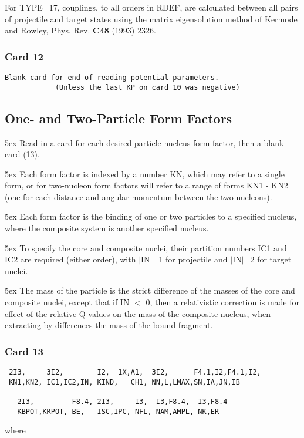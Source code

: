 \documentclass[11pt]{article}
\begin{document}
For TYPE=17, couplings, to all orders in RDEF, are calculated between all
pairs of projectile and target states using the matrix eigensolution
method of Kermode and Rowley, Phys. Rev. {\bf C48} (1993) 2326.

\bigskip
\subsubsection*{Card 12}

\begin{verbatim}
Blank card for end of reading potential parameters.
            (Unless the last KP on card 10 was negative)
\end{verbatim}

\newpage
\subsection{One- and Two-Particle Form Factors}
%
\bigskip


\hangindent 5ex
Read in a card for each desired particle-nucleus form factor,
then a blank card (13).

\hangindent 5ex
Each form factor is indexed by a number KN, which may refer to
a single form, or for two-nucleon form factors will refer to a range
of forms KN1 - KN2
(one for each distance and angular momentum between the two nucleons).

\hangindent 5ex
Each form factor is the binding of one or two particles to a
specified nucleus, where the composite system is another specified
nucleus.

\hangindent 5ex
To specify the core and composite nuclei, their partition numbers
IC1 and IC2 are required (either order), with $|$IN$|$=1 for projectile
and $|$IN$|$=2 for target nuclei.

\hangindent 5ex
The mass of the particle is the strict difference of the masses of
the core and composite nuclei, except that if IN $<$ 0, then a
relativistic correction is made for effect of the relative Q-values
on the mass of the composite nucleus, when extracting by differences
the mass of the bound fragment.

\subsubsection*{Card 13}
\begin{verbatim}
 2I3,     3I2,        I2,  1X,A1,  3I2,      F4.1,I2,F4.1,I2,
 KN1,KN2, IC1,IC2,IN, KIND,   CH1, NN,L,LMAX,SN,IA,JN,IB

   2I3,         F8.4, 2I3,     I3,  I3,F8.4,  I3,F8.4
   KBPOT,KRPOT, BE,   ISC,IPC, NFL, NAM,AMPL, NK,ER
\end{verbatim}
where
\end{document}
